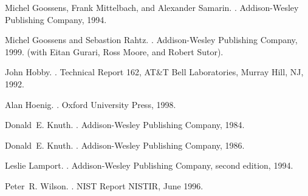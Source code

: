 \documentclass[11pt]{article}
\begin{document}
\begin{thebibliography}{GMS94}

Michel Goossens, Frank Mittelbach, and Alexander Samarin.
.
\newblock Addison-Wesley Publishing Company, 1994.

Michel Goossens and Sebastion Rahtz.
.
\newblock Addison-Wesley Publishing Company, 1999.
\newblock (with Eitan Gurari, Ross Moore, and Robert Sutor).

John Hobby.
.
\newblock Technical Report 162, AT\&T Bell Laboratories, Murray Hill, NJ, 1992.

Alan Hoenig.
.
\newblock Oxford University Press, 1998.

Donald~E. Knuth.
.
\newblock Addison-Wesley Publishing Company, 1984.

Donald~E. Knuth.
.
\newblock Addison-Wesley Publishing Company, 1986.

Leslie Lamport.
.
\newblock Addison-Wesley Publishing Company, second edition, 1994.

Peter~R. Wilson.
.
\newblock NIST Report NISTIR, June 1996.

\end{thebibliography}
\end{document}
